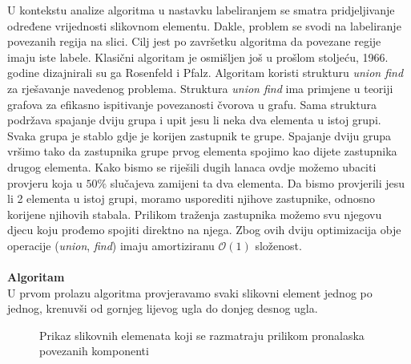 \documentclass[times, utf8, diplomski]{fer}
\theoremstyle{definition}
\begin{document}
U kontekstu analize algoritma u nastavku labeliranjem se smatra pridjeljivanje određene vrijednosti slikovnom elementu. Dakle, problem se svodi na labeliranje povezanih regija na slici. Cilj jest po završetku algoritma da povezane regije imaju iste labele. Klasični algoritam je osmišljen još u prošlom stoljeću, 1966. godine dizajnirali su ga Rosenfeld i Pfalz. Algoritam koristi strukturu \textit{union find} za rješavanje navedenog problema. Struktura \textit{union find} ima primjene u teoriji grafova za efikasno ispitivanje povezanosti čvorova u grafu. Sama struktura podržava spajanje dviju grupa i upit jesu li neka dva elementa u istoj grupi. Svaka grupa je stablo gdje je korijen zastupnik te grupe. Spajanje dviju grupa vršimo tako da zastupnika grupe prvog elementa spojimo kao dijete zastupnika drugog elementa. Kako bismo se riješili dugih lanaca ovdje možemo ubaciti provjeru koja u $50\%$ slučajeva zamijeni ta dva elementa. Da bismo provjerili jesu li 2 elementa u istoj grupi, moramo usporediti njihove zastupnike, odnosno korijene njihovih stabala. Prilikom traženja zastupnika možemo svu njegovu djecu koju prođemo spojiti direktno na njega. Zbog ovih dviju optimizacija obje operacije (\textit{union}, \textit{find}) imaju amortiziranu $\mathcal{O}(1)$ složenost.
\\
\\
\textbf{Algoritam}\\
U prvom prolazu algoritma provjeravamo svaki slikovni element jednog po jednog, krenuvši od gornjeg lijevog ugla do donjeg desnog ugla.
\begin{figure}[h]
	\begin{center}
	\end{center}
\caption{Prikaz slikovnih elemenata koji se razmatraju prilikom pronalaska povezanih komponenti}
\end{figure}
\end{document}
